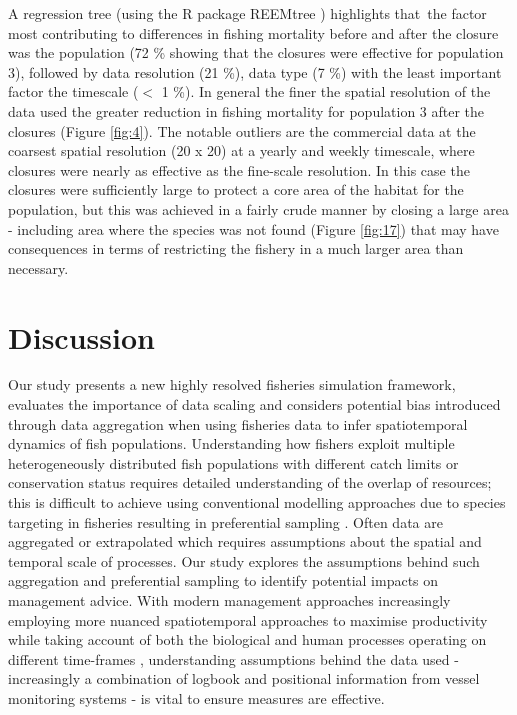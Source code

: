 \documentclass[review]{elsarticle}
\begin{document}
A regression tree (using the R package REEMtree \citep{Sela2012}) highlights
that the factor most contributing to differences in fishing mortality before
and after the closure was the population (72 \% showing that the closures were
effective for population 3), followed by data resolution (21 \%), data type (7
\%) with the least important factor the timescale ($<$ 1 \%). In general the
finer the spatial resolution of the data used the greater reduction in fishing
mortality for population 3 after the closures (Figure \ref{fig:4}). The notable
outliers are the commercial data at the coarsest spatial resolution (20 x 20)
at a yearly and weekly timescale, where closures were nearly as effective as
the fine-scale resolution. In this case the closures were sufficiently large to
protect a core area of the habitat for the population, but this was achieved in
a fairly crude manner by closing a large area - including area where the
species was not found (Figure \ref{fig:17}) that may have consequences in terms
of restricting the fishery in a much larger area than necessary. \\

\section{Discussion}

Our study presents a new highly resolved fisheries simulation framework,
evaluates the importance of data scaling and considers potential bias
introduced through data aggregation when using fisheries data to infer
spatiotemporal dynamics of fish populations. Understanding how fishers exploit
multiple heterogeneously distributed fish populations with different catch
limits or conservation status requires detailed understanding of the overlap of
resources; this is difficult to achieve using conventional modelling approaches
due to species targeting in fisheries resulting in preferential sampling
\citep{Martinez-Minaya2018}. Often data are aggregated or extrapolated which
requires assumptions about the spatial and temporal scale of processes. Our
study explores the assumptions behind such aggregation and preferential
sampling to identify potential impacts on management advice. With modern
management approaches increasingly employing more nuanced spatiotemporal
approaches to maximise productivity while taking account of both the biological
and human processes operating on different time-frames \citep{Dunn2016},
understanding assumptions behind the data used - increasingly a combination of
logbook and positional information from vessel monitoring systems - is vital to
ensure measures are effective. \\
\end{document}

